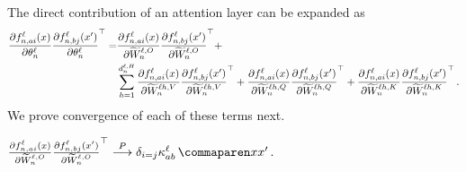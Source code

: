 The direct contribution of an attention layer can be expanded as
\begin{align*}
    \frac{
        \partial {f}^{\ell}_{n, a i}{(x)}
    }{
        \partial \theta_{n}^{\ell}
    }
        \frac{
            \partial {f}^{\ell}_{n, b j}{(x')}
        }{
            \partial \theta_{n}^{\ell}
        }^\top
    =
    &\frac{
        \partial {f}^{\ell}_{n, a i}{(x)}
    }{
        \partial \widetilde{W}_n^{\ell, O}
    }
    \frac{
        \partial {f}^{\ell}_{n, b j}{(x')}
    }{
        \partial \widetilde{W}_n^{\ell, O}
    }^\top
    +
    \\
    &\sum_{h = 1}^{d_{n}^{\ell, H}}
        \frac{
            \partial {f}^{\ell}_{n, a i}{(x)}
        }{
            \partial \widetilde{W}_n^{\ell h, V}
        }
        \frac{
            \partial {f}^{\ell}_{n, b j}{(x')}
        }{
            \partial \widetilde{W}_n^{\ell h, V}
        }^\top
        +
        \frac{
            \partial {f}^{\ell}_{n, a i}{(x)}
        }{
            \partial \widetilde{W}_n^{\ell h, Q}
        }
        \frac{
            \partial {f}^{\ell}_{n, b j}{(x')}
        }{
            \partial \widetilde{W}_n^{\ell h, Q}
        }^\top
        +
        \frac{
            \partial {f}^{\ell}_{n, a i}{(x)}
        }{
            \partial \widetilde{W}_n^{\ell h, K}
        }
        \frac{
            \partial {f}^{\ell}_{n, b j}{(x')}
        }{
            \partial \widetilde{W}_n^{\ell h, K}
        }^\top
    \, .
\end{align*}
We prove convergence of each of these terms next.

\begin{lemma}\label{lem:wo_ntk}
$
    \frac{
        \partial \indexedActivation{\depthSymbol}{\sequenceVariable, \fIndexA i}{\inputSymbol}
    }{
        \partial \uW_\sequenceVariable^{\depthSymbol, \outputSymbol}
    }
    \frac{
        \partial \indexedActivation{\depthSymbol}{\sequenceVariable, \fIndexB j}{\inputSymbol'}
    }{
        \partial \uW_\sequenceVariable^{\depthSymbol, \outputSymbol}
    }^\top
    \convergeProb
    \delta_{i = j}
    \kernelf{a b}{\depthSymbol}{\inputSymbol}{\inputSymbol'}
    \, .
$
\end{lemma}


